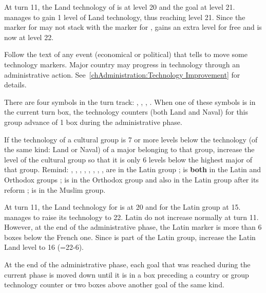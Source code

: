 \begin{exemple}
  At turn 11, the Land technology of \FRA is at level 20 and the goal \TARQ at
  level 21. \FRA manages to gain 1 level of Land technology, thus reaching
  level 21. Since the marker for \FRA may not stack with the marker for \TARQ,
  \FRA gains an extra level for free and is now at level 22.
\end{exemple}

 Follow the text of any event (economical or
political) that tells to move some technology markers.
\bparag Major country may progress in technology through an administrative
action. See~\ref{chAdministration:Technology Improvement} for details.

 There are four symbols in the turn track:
\techlatin, \techislam, \techortho, \techrotw. When one of these symbols is in
the current turn box, the technology counters (both Land and Naval) for this
group advance of 1 box during the administrative phase.

\label{chAdministration:Technology:Cultural Adjustment}
If the technology of a cultural group is 7 or more levels below the technology
(of the same kind: Land or Naval) of a major belonging to that group, increase
the level of the cultural group so that it is only 6 levels below the highest
major of that group.
\bparag Remind: \POR, \SPA, \FRA, \ANG, \VEN, \HOL, \SUE, \AUS, \PRU are in
the Latin group ; \POL is \textbf{both} in the Latin and Orthodox groups ;
\RUS is in the Orthodox group and also in the Latin group after its reform ;
\TUR is in the Muslim group.

\begin{exemple}
  At turn 11, the Land technology for \FRA is at 20 and for the Latin group at
  15. \FRA manages to raise its technology to 22. Latin do not increase
  normally at turn 11. However, at the end of the administrative phase, the
  Latin marker is more than 6 boxes below the French one. Since \FRA is part
  of the Latin group, increase the Latin Land level to 16 (=22-6).
\end{exemple}

\label{chAdministration:Technology:Goals Adjustment}
At the end of the administrative phase, each goal that was reached during the
current phase is moved down until it is in a box preceding a country or group
technology counter or two boxes above another goal of the same kind.

